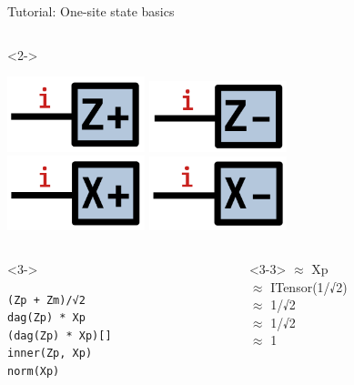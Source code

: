 \begin{frame}[fragile]{Tutorial: One-site state basics}
\begin{columns}
\begin{column}[T]{0.6\textwidth}
\begin{onlyenv}<2->
\vspace*{-0.4cm}
\begin{center}
\includegraphics[width=0.3\textwidth]{
  slides/assets/Zp.png
}
\includegraphics[width=0.3\textwidth]{
  slides/assets/Zm.png
} \\
\includegraphics[width=0.3\textwidth]{
  slides/assets/Xp.png
}
\includegraphics[width=0.3\textwidth]{
  slides/assets/Xm.png
}
\end{center}
\end{onlyenv}
\end{column}

\end{columns}

\begin{columns}

\begin{column}[T]{0.45\textwidth}
\begin{onlyenv}<3->
\begin{lstlisting}[language=JuliaLocal, style=julia, basicstyle=\small]
(Zp + Zm)/√2
dag(Zp) * Xp
(dag(Zp) * Xp)[]
inner(Zp, Xp)
norm(Xp)
\end{lstlisting}
\end{onlyenv}
\end{column}

\begin{column}[T]{0.6\textwidth}
\begin{onlyenv}<3-3>
$\approx$ Xp \\
$\approx$ ITensor(1/√2) \\
$\approx$ 1/√2 \\
$\approx$ 1/√2 \\
$\approx$ 1
\end{onlyenv}


\end{column}
\end{columns}
\end{frame}
